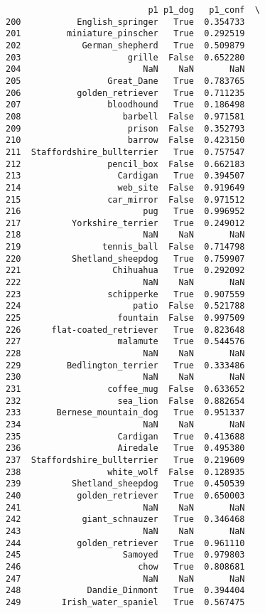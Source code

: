 \documentclass[11pt]{article}
\begin{document}
\begin{verbatim}
                            p1 p1_dog   p1_conf  \
200           English_springer   True  0.354733   
201         miniature_pinscher   True  0.292519   
202            German_shepherd   True  0.509879   
203                     grille  False  0.652280   
204                        NaN    NaN       NaN   
205                 Great_Dane   True  0.783765   
206           golden_retriever   True  0.711235   
207                 bloodhound   True  0.186498   
208                    barbell  False  0.971581   
209                     prison  False  0.352793   
210                     barrow  False  0.423150   
211  Staffordshire_bullterrier   True  0.757547   
212                 pencil_box  False  0.662183   
213                   Cardigan   True  0.394507   
214                   web_site  False  0.919649   
215                 car_mirror  False  0.971512   
216                        pug   True  0.996952   
217          Yorkshire_terrier   True  0.249012   
218                        NaN    NaN       NaN   
219                tennis_ball  False  0.714798   
220          Shetland_sheepdog   True  0.759907   
221                  Chihuahua   True  0.292092   
222                        NaN    NaN       NaN   
223                 schipperke   True  0.907559   
224                      patio  False  0.521788   
225                   fountain  False  0.997509   
226      flat-coated_retriever   True  0.823648   
227                   malamute   True  0.544576   
228                        NaN    NaN       NaN   
229         Bedlington_terrier   True  0.333486   
230                        NaN    NaN       NaN   
231                 coffee_mug  False  0.633652   
232                   sea_lion  False  0.882654   
233       Bernese_mountain_dog   True  0.951337   
234                        NaN    NaN       NaN   
235                   Cardigan   True  0.413688   
236                   Airedale   True  0.495380   
237  Staffordshire_bullterrier   True  0.219609   
238                 white_wolf  False  0.128935   
239          Shetland_sheepdog   True  0.450539   
240           golden_retriever   True  0.650003   
241                        NaN    NaN       NaN   
242            giant_schnauzer   True  0.346468   
243                        NaN    NaN       NaN   
244           golden_retriever   True  0.961110   
245                    Samoyed   True  0.979803   
246                       chow   True  0.808681   
247                        NaN    NaN       NaN   
248             Dandie_Dinmont   True  0.394404   
249        Irish_water_spaniel   True  0.567475   


\end{verbatim}
\end{document}
